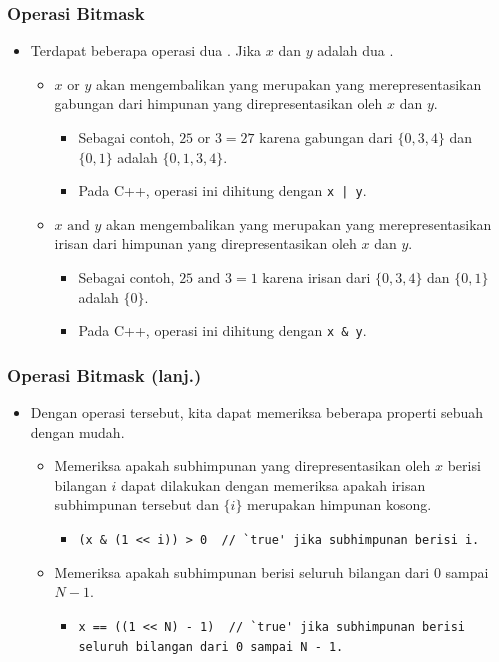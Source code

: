 \begin{frame}
\frametitle{Operasi Bitmask}
\begin{itemize}
  \item Terdapat beberapa operasi dua \fbitmask. Jika $x$ dan $y$ adalah dua \fbitmask.
  \begin{itemize}
    \item $x \text{ or } y$ akan mengembalikan \fbitmask yang merupakan \fbitmask yang merepresentasikan gabungan dari himpunan yang direpresentasikan oleh $x$ dan $y$.
    \begin{itemize}
      \item Sebagai contoh, $25 \text{ or } 3 = 27$ karena gabungan dari $\{0, 3, 4\}$ dan $\{0, 1\}$ adalah $\{0, 1, 3, 4\}$.
      \item Pada C++, operasi ini dihitung dengan \lstinline{x | y}.
    \end{itemize}
    \item $x \text{ and } y$ akan mengembalikan \fbitmask yang merupakan \fbitmask yang merepresentasikan irisan dari himpunan yang direpresentasikan oleh $x$ dan $y$.
    \begin{itemize}
      \item Sebagai contoh, $25 \text{ and } 3 = 1$ karena irisan dari $\{0, 3, 4\}$ dan $\{0, 1\}$ adalah $\{0\}$.
      \item Pada C++, operasi ini dihitung dengan \lstinline{x & y}.
    \end{itemize}
  \end{itemize}
\end{itemize}
\end{frame}

\begin{frame}
\frametitle{Operasi Bitmask (lanj.)}
\begin{itemize}
  \item Dengan operasi tersebut, kita dapat memeriksa beberapa properti sebuah \fbitmask dengan mudah.
  \begin{itemize}
    \item Memeriksa apakah subhimpunan yang direpresentasikan oleh \fbitmask $x$ berisi bilangan $i$ dapat dilakukan dengan memeriksa apakah irisan subhimpunan tersebut dan $\{i\}$ merupakan himpunan kosong.
    \begin{itemize}
      \item \lstinline{(x & (1 << i)) > 0  // `true' jika subhimpunan berisi i.}
    \end{itemize}
    \item Memeriksa apakah subhimpunan berisi seluruh bilangan dari $0$ sampai $N - 1$.
    \begin{itemize}
      \item \lstinline{x == ((1 << N) - 1)  // `true' jika subhimpunan berisi seluruh bilangan dari 0 sampai N - 1.}
    \end{itemize}
  \end{itemize}
\end{itemize}
\end{frame}

